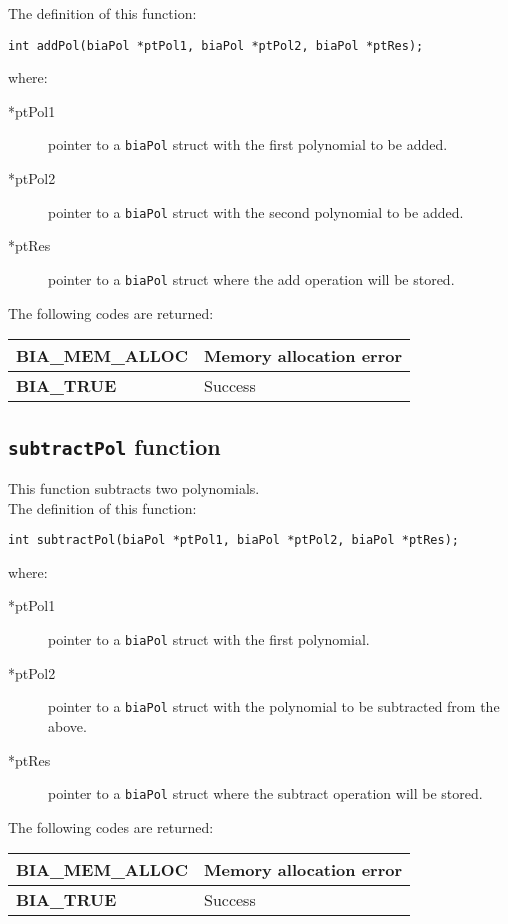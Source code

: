 The definition of this function:
%
\begin{verbatim}
int addPol(biaPol *ptPol1, biaPol *ptPol2, biaPol *ptRes);  
\end{verbatim}
%
where:
%
\begin{description}
\item[*ptPol1] pointer to a \texttt{biaPol} struct with the first polynomial to be added.
\item[*ptPol2] pointer to a \texttt{biaPol} struct with the second polynomial to be added.
\item[*ptRes] pointer to a \texttt{biaPol} struct where the add operation will be stored.
\end{description}
%
The following codes are returned:
%
\begin{center}
\begin{tabular}{|l|l|}
\hline
\textbf{BIA\_MEM\_ALLOC} & Memory allocation error \\
\hline
\textbf{BIA\_TRUE} & Success \\
\hline
\end{tabular}
\end{center}
%
%

\subsection{\texttt{subtractPol} function}

This function subtracts two polynomials.\\

The definition of this function:
%
\begin{verbatim}
int subtractPol(biaPol *ptPol1, biaPol *ptPol2, biaPol *ptRes);
\end{verbatim}
%
where:
%
\begin{description}
\item[*ptPol1] pointer to a \texttt{biaPol} struct with the first polynomial.
\item[*ptPol2] pointer to a \texttt{biaPol} struct with the polynomial to be subtracted from the above.
\item[*ptRes] pointer to a \texttt{biaPol} struct where the subtract operation will be stored.
\end{description}
%
The following codes are returned:
%
\begin{center}
\begin{tabular}{|l|l|}
\hline
\textbf{BIA\_MEM\_ALLOC} & Memory allocation error \\
\hline
\textbf{BIA\_TRUE} & Success \\
\hline
\end{tabular}
\end{center}
%
%

